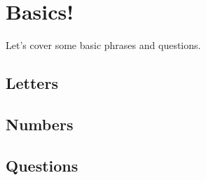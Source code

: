 \chapter{Basics!}

Let's cover some basic phrases and questions.

\section{Letters}

\section{Numbers}

\section{Questions}
